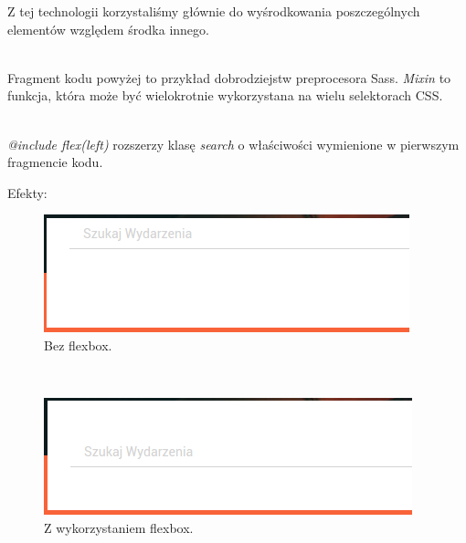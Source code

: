 Z tej technologii korzystaliśmy głównie do wyśrodkowania poszczególnych elementów względem środka innego.

\begin{code}
	
\end{code}\\

Fragment kodu powyżej to przykład dobrodziejstw preprocesora Sass. \emph{Mixin} to funkcja, która może być wielokrotnie wykorzystana na wielu selektorach CSS.

\begin{code}
	
\end{code}\\

\emph{@include flex(left)} rozszerzy klasę \emph{search} o właściwości wymienione w pierwszym fragmencie kodu.

\clearpage

Efekty:
\begin{figure}[h]
	\centering
  \includegraphics[scale=0.8]{images/flex_before.png}
  \caption{Bez flexbox.}
\end{figure}\\

\begin{figure}[h]
	\centering
  \includegraphics[scale=0.8]{images/flex_after.png}
  \caption{Z wykorzystaniem flexbox.}
\end{figure}

